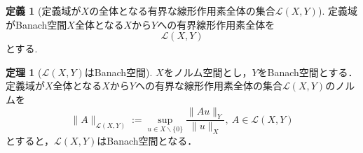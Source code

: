 \documentclass[11pt,a4paper,titlepage]{jsreport}
\theoremstyle{definition}
\newtheorem{dfn}{定義}
\newtheorem{thm}{定理}
\begin{document}
\begin{dfn}[定義域が$X$の全体となる有界な線形作用素全体の集合$\mathcal{L}(X,Y)$]
  定義域がBanach空間$X$全体となる$X$から$Y$への有界線形作用素全体を
  \begin{equation*}
    \mathcal{L}(X,Y)
  \end{equation*}
  とする.
\end{dfn}

\begin{thm}[$\mathcal{L}(X,Y)$はBanach空間]
  $X$をノルム空間とし，$Y$をBanach空間とする．定義域が$X$全体となる$X$から$Y$への有界な線形作用素全体の集合$\mathcal{L}(X,Y)$のノルムを
  \begin{equation*}
    \|A\|_{\mathcal{L}(X,Y)}:=\sup_{u\in X\backslash\{0\}} \frac{\|Au\|_Y}{\|u\|_X}, \ A\in\mathcal{L}(X,Y)
  \end{equation*}
  とすると，$\mathcal{L}(X,Y)$はBanach空間となる．
\end{thm}
\end{document}
